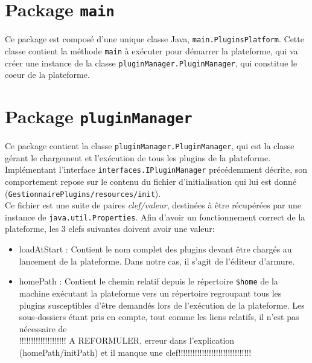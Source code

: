 \section{Package \texttt{main}}

Ce package est composé d'une unique classe Java, \texttt{main.PluginsPlatform}. Cette classe contient la méthode \texttt{main} à exécuter pour démarrer la plateforme, qui va créer une instance de la classe \texttt{pluginManager.PluginManager}, qui constitue le coeur de la plateforme.


\section{Package \texttt{pluginManager}}

Ce package contient la classe \texttt{pluginManager.PluginManager}, qui est la classe gérant le chargement et l'exécution de tous les plugins de la plateforme. Implémentant l'interface \texttt{interfaces.IPluginManager} précédemment décrite, son comportement repose sur le contenu du fichier d'initialisation qui lui est donné (\texttt{GestionnairePlugins/resources/init}).\\

Ce fichier est une suite de paires \textit{clef/valeur}, destinées à être récupérées par une instance de \texttt{java.util.Properties}. Afin d'avoir un fonctionnement correct de la plateforme, les 3 clefs suivantes doivent avoir une valeur:\\

\begin{itemize}
	\item loadAtStart : Contient le nom complet des plugins devant être chargés au lancement de la plateforme. Dans notre cas, il s'agit de l'éditeur d'armure.
	\item homePath : Contient le chemin relatif depuis le répertoire \texttt{\$home} de la machine exécutant la plateforme vers un répertoire regroupant tous les plugins susceptibles d'être demandés lors de l'exécution de la plateforme. Les sous-dossiers étant pris en compte, tout comme les liens relatifs, il n'est pas nécessaire de \\
	!!!!!!!!!!!!!!!!!!!! A REFORMULER, erreur dans l'explication (homePath/initPath) et il manque une clef!!!!!!!!!!!!!!!!!!!!!!!!!!!!!!!
\end{itemize}

